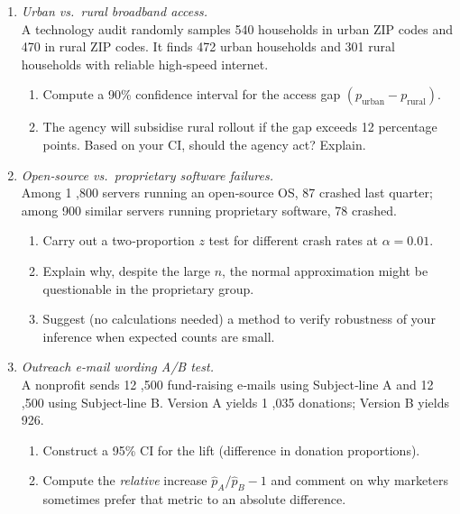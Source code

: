 \documentclass[11pt]{article}
\begin{document}
\begin{enumerate}[label=\textbf{Q\,\arabic*:}, start=16, left=0pt]

\item  \emph{Urban vs.\ rural broadband access.} \\
      A technology audit randomly samples 540 households in urban ZIP codes and 470 in rural ZIP codes.
      It finds 472 urban households and 301 rural households with reliable high‑speed internet.
      \begin{enumerate}[label=(\alph*)]
          \item Compute a 90\% confidence interval for the access gap $(p_{\text{urban}}-p_{\text{rural}})$.
          \item The agency will subsidise rural rollout if the gap exceeds 12 percentage points.
                Based on your CI, should the agency act?  Explain.
      \end{enumerate}

\item  \emph{Open‑source vs.\ proprietary software failures.} \\
      Among 1 ,800 servers running an open‑source OS, 87 crashed last quarter;
      among 900 similar servers running proprietary software, 78 crashed.
      \begin{enumerate}[label=(\alph*)]
          \item Carry out a two‑proportion $z$ test for different crash rates at $\alpha=0.01$.
          \item Explain why, despite the large $n$, the normal approximation might be questionable in the proprietary group.
          \item Suggest (no calculations needed) a method to verify robustness of your inference when expected counts are small.
      \end{enumerate}

\item  \emph{Outreach e‑mail wording A/B test.} \\
      A nonprofit sends 12 ,500 fund‑raising e‑mails using Subject‑line A and 12 ,500 using Subject‑line B.
      Version A yields 1 ,035 donations; Version B yields 926.
      \begin{enumerate}[label=(\alph*)]
          \item Construct a 95\% CI for the lift (difference in donation proportions).
          \item Compute the \emph{relative} increase $\hat{p}_A/\hat{p}_B-1$ and
                comment on why marketers sometimes prefer that metric to an absolute difference.
      \end{enumerate}


\end{enumerate}
\end{document}
